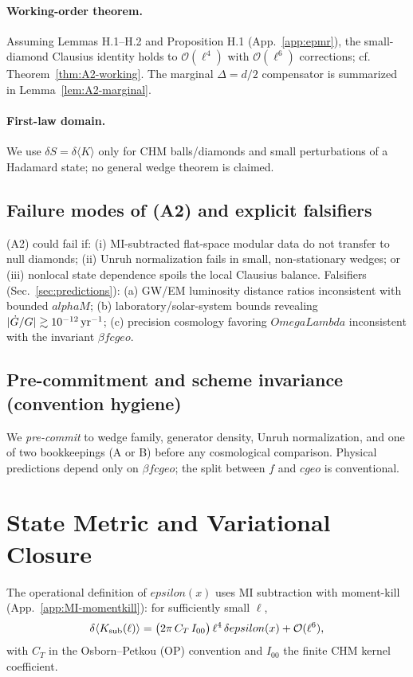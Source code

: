 \documentclass[aps,prd,onecolumn,superscriptaddress,nofootinbib]{revtex4-2}
\def\OmL{OmegaLambda}%
\def\cgeo{cgeo}%
\def\alphaM{alphaM}%
\def\eps{epsilon}%
\newcommand{\OmL}{\Omega_\Lambda}
\newcommand{\cgeo}{c_{\rm geo}}
\newcommand{\alphaM}{\alpha_M}
\newcommand{\eps}{\varepsilon}
\begin{document}
\paragraph{Working-order theorem.} Assuming Lemmas H.1–H.2 and Proposition H.1 (App.~\ref{app:epmr}), the small-diamond Clausius identity holds to $\mathcal O(\ell^4)$ with $\mathcal O(\ell^6)$ corrections; cf. Theorem~\ref{thm:A2-working}. The marginal $\Delta=d/2$ compensator is summarized in Lemma~\ref{lem:A2-marginal}.

\paragraph{First-law domain.} We use $\delta S=\delta\langle K\rangle$ only for CHM balls/diamonds and small perturbations of a Hadamard state; no general wedge theorem is claimed.

\subsection{Failure modes of (A2) and explicit falsifiers}
\label{sec:a2-fail}
(A2) could fail if: (i) MI-subtracted flat-space modular data do not transfer to null diamonds; (ii) Unruh normalization fails in small, non-stationary wedges; or (iii) nonlocal state dependence spoils the local Clausius balance. Falsifiers (Sec.~\ref{sec:predictions}): (a) GW/EM luminosity distance ratios inconsistent with bounded $\alphaM$; (b) laboratory/solar-system bounds revealing $|\dot G/G|\gtrsim 10^{-12}\,{\rm yr}^{-1}$; (c) precision cosmology favoring $\OmL$ inconsistent with the invariant $\beta f \cgeo$.

\subsection{Pre-commitment and scheme invariance (convention hygiene)}
\label{sec:precommit}
We \emph{pre-commit} to wedge family, generator density, Unruh normalization, and one of two bookkeepings (A or B) before any cosmological comparison. Physical predictions depend only on $\beta f \cgeo$; the split between $f$ and $\cgeo$ is conventional.

\section{State Metric and Variational Closure}
\label{sec:state-metric}
The operational definition of $\eps(x)$ uses MI subtraction with moment-kill (App.~\ref{app:MI-momentkill}): for sufficiently small $\ell$,
\begin{equation}
\label{eq:sigma-operational}
\delta\langle K_{\rm sub}(\ell)\rangle = \big(2\pi\, C_T\, I_{00}\big)\,\ell^4\,\delta\eps(x) + \mathcal O(\ell^6),
\end{equation}
with $C_T$ in the Osborn--Petkou (OP) convention and $I_{00}$ the finite CHM kernel coefficient.
\end{document}
